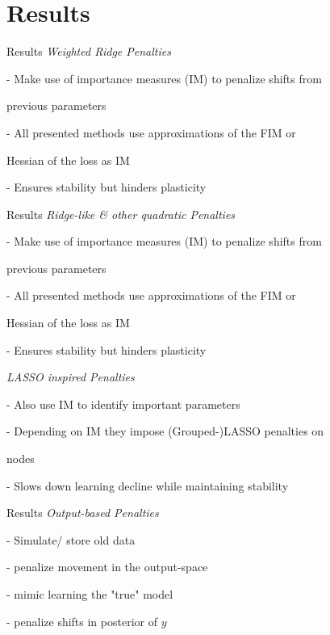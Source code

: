 \documentclass{beamer}
\begin{document}
\section{Results}

\begin{frame}[t]{Results}
	\textit{Weighted Ridge Penalties}
	
	\vspace{0.25cm}
	\quad - Make use of importance measures (IM) to penalize shifts from
	
	\quad previous parameters
	
	\quad - All presented methods use approximations of the FIM or
	
	\quad Hessian of the loss as IM
	
	\quad - Ensures stability but hinders plasticity
\end{frame}

\begin{frame}[t]{Results}
	\textit{Ridge-like \& other quadratic Penalties}
	
	\vspace{0.25cm}
	\quad - Make use of importance measures (IM) to penalize shifts from
	
	\quad previous parameters
	
	\quad - All presented methods use approximations of the FIM or
	
	\quad Hessian of the loss as IM
	
	\quad - Ensures stability but hinders plasticity
	
	\vspace{0.5cm}
	\textit{LASSO inspired Penalties}
	
	\vspace{0.25cm}
	\quad - Also use IM to identify important parameters
	
	\quad - Depending on IM they impose (Grouped-)LASSO penalties on
	
	\quad nodes
	
	\quad - Slows down learning decline while maintaining stability
		
\end{frame}

\begin{frame}[t]{Results}
	\textit{Output-based Penalties}
	
	\vspace{0.25cm}
	\quad - Simulate/ store old data
	
	\quad - penalize movement in the output-space 
	
	\quad - mimic learning the "true" model
	
	\quad - penalize shifts in posterior of $y$
\end{frame}
\end{document}
